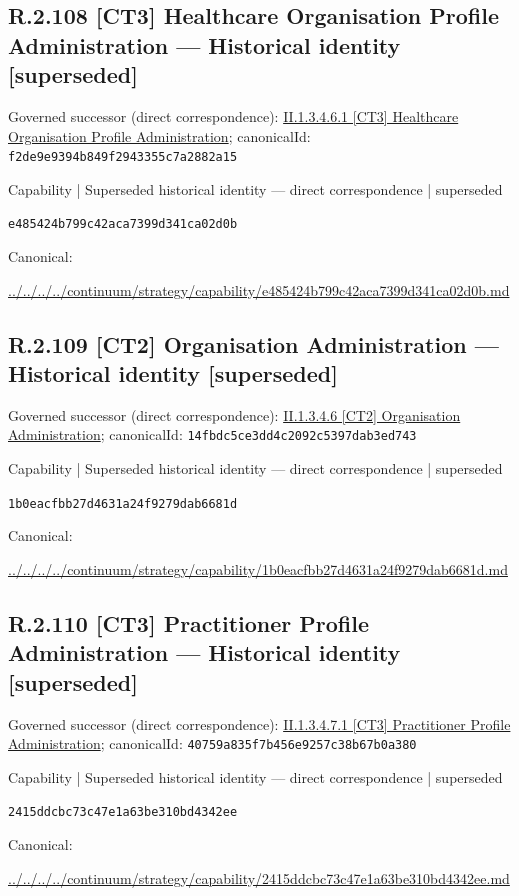 \documentclass[10pt,a4paper]{article}
\begin{document}
\subsection*{R.2.108 [CT3] Healthcare Organisation Profile Administration — Historical identity [superseded]}
Governed successor (direct correspondence): \hyperref[element-f2de9e9394b849f2943355c7a2882a15]{II.1.3.4.6.1 [CT3] Healthcare Organisation Profile Administration}; canonicalId: \texttt{f2de9e9394b849f2943355c7a2882a15}\par
\label{element-e485424b799c42aca7399d341ca02d0b}
{\small Capability | Superseded historical identity — direct correspondence | superseded}\par
\texttt{e485424b799c42aca7399d341ca02d0b}\par
Canonical: \par
{\footnotesize\url{../../../../continuum/strategy/capability/e485424b799c42aca7399d341ca02d0b.md}}\par
\subsection*{R.2.109 [CT2] Organisation Administration — Historical identity [superseded]}
Governed successor (direct correspondence): \hyperref[element-14fbdc5ce3dd4c2092c5397dab3ed743]{II.1.3.4.6 [CT2] Organisation Administration}; canonicalId: \texttt{14fbdc5ce3dd4c2092c5397dab3ed743}\par
\label{element-1b0eacfbb27d4631a24f9279dab6681d}
{\small Capability | Superseded historical identity — direct correspondence | superseded}\par
\texttt{1b0eacfbb27d4631a24f9279dab6681d}\par
Canonical: \par
{\footnotesize\url{../../../../continuum/strategy/capability/1b0eacfbb27d4631a24f9279dab6681d.md}}\par
\subsection*{R.2.110 [CT3] Practitioner Profile Administration — Historical identity [superseded]}
Governed successor (direct correspondence): \hyperref[element-40759a835f7b456e9257c38b67b0a380]{II.1.3.4.7.1 [CT3] Practitioner Profile Administration}; canonicalId: \texttt{40759a835f7b456e9257c38b67b0a380}\par
\label{element-2415ddcbc73c47e1a63be310bd4342ee}
{\small Capability | Superseded historical identity — direct correspondence | superseded}\par
\texttt{2415ddcbc73c47e1a63be310bd4342ee}\par
Canonical: \par
{\footnotesize\url{../../../../continuum/strategy/capability/2415ddcbc73c47e1a63be310bd4342ee.md}}\par
\end{document}
